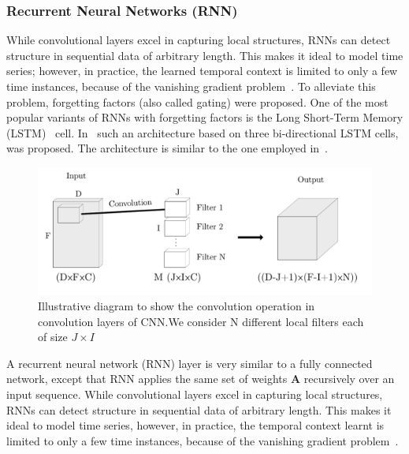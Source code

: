 \subsubsection{Recurrent Neural Networks (RNN)}%
While convolutional layers excel in capturing local structures, RNNs can detect structure in sequential data of arbitrary length.
This makes it ideal to model time series; however, in practice, the learned temporal context is limited to only a few time instances, because of the vanishing gradient problem~\cite{Hochreiter98}.
To alleviate this problem, forgetting factors (also called gating) were proposed.
One of the most popular variants of RNNs with forgetting factors is the Long Short-Term Memory (LSTM)~\cite{Hochreiter97} cell.
In~\cite{stoeter17} such an architecture based on three bi-directional LSTM cells, was proposed. The architecture is similar to the one employed in~\cite{Leglaive15}.

\begin{figure}[t]
\centering
\includegraphics[width=\columnwidth]{Chapters/08_Analysis_CountNet/figures/conv.pdf}
\caption{Illustrative diagram to show the convolution operation in
convolution layers of CNN.\@ We consider N different local filters each
of size \(J\times I\)}%
\label{fig:conv}
\end{figure}

A recurrent neural network (RNN) layer is very similar to a fully connected network, except that RNN applies the same set of weights \(\mathbf{A}\) recursively over an input sequence.
While convolutional layers excel in capturing local structures, RNNs can detect structure in sequential data of arbitrary length. %
This makes it ideal to model time series, however, in practice, the temporal context learnt is limited to only a few time instances, because of the vanishing gradient problem~\cite{Hochreiter98}.

